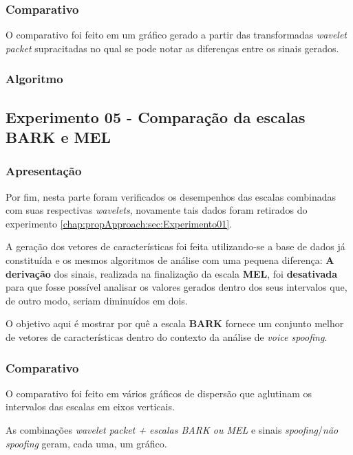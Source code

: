 			\subsubsection{Comparativo}
				\par O comparativo foi feito em um gráfico gerado a partir das transformadas \textit{wavelet packet} supracitadas no qual se pode notar as diferenças entre os sinais gerados.
			\subsubsection{Algoritmo}
				

		\subsection{Experimento 05 - Comparação da escalas BARK e MEL}
		\label{chap:propApproach:sec:Experimento05}
			\subsubsection{Apresentação}
				\par Por fim, nesta parte foram verificados os desempenhos das escalas combinadas com suas respectivas \textit{wavelets}, novamente tais dados foram retirados do experimento \ref{chap:propApproach:sec:Experimento01}.
				\par A geração dos vetores de características foi feita utilizando-se a base de dados já constituída e os mesmos algoritmos de análise com uma pequena diferença: \textbf{A derivação} dos sinais, realizada na finalização da escala \textbf{MEL}, foi \textbf{desativada} para que fosse possível analisar os valores gerados dentro dos seus intervalos que, de outro modo, seriam diminuídos em dois.

				\par O objetivo aqui é mostrar por quê a escala \textbf{BARK} fornece um conjunto melhor de vetores de características dentro do contexto da análise de \textit{voice spoofing}.

			\subsubsection{Comparativo}
				\par O comparativo foi feito em vários gráficos de dispersão que aglutinam os intervalos das escalas em eixos verticais. 
				\par As combinações \textit{wavelet packet + escalas BARK ou MEL} e sinais \textit{spoofing}/\textit{não spoofing} geram, cada uma, um gráfico.